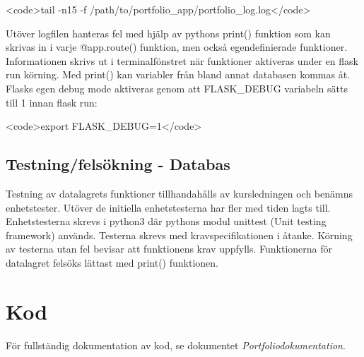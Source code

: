\documentclass{TDP003mall}
\begin{document}
<code>tail -n15 -f /path/to/portfolio\_app/portfolio\_log.log</code>

Utöver logfilen hanteras fel med hjälp av pythons print() funktion som kan skrivas in i varje @app.route() funktion, men också egendefinierade funktioner. Informationen skrivs ut i terminalfönstret när funktioner aktiveras under en flask run körning. Med print() kan variabler från bland annat databasen kommas åt. Flasks egen debug mode aktiveras genom att FLASK\_DEBUG variabeln sätts till 1 innan flask run:

<code>export FLASK\_DEBUG=1</code>

\subsection{Testning/felsökning - Databas}
Testning av datalagrets funktioner tillhandahålls av kursledningen och benämns enhetstester. Utöver de initiella enhetstesterna har fler med tiden lagts till. Enhetstesterna skrevs i python3 där pythons modul unittest (Unit testing framework) används. Testerna skrevs med kravspecifikationen i åtanke. Körning av testerna utan fel bevisar att funktionens krav uppfylls. Funktionerna för datalagret felsöks lättast med print() funktionen.

\section{Kod}
För fullständig dokumentation av kod, se dokumentet \textit{Portfoliodokumentation}.
\end{document}

